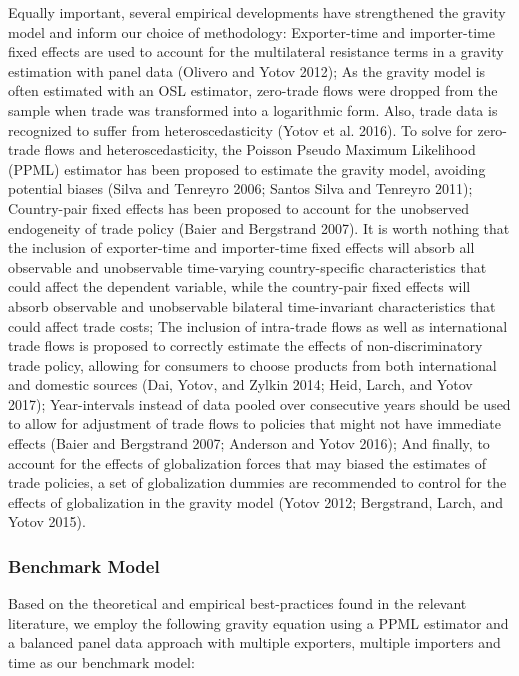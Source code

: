 \documentclass[12pt]{article}%
\begin{document}
Equally important, several empirical developments have strengthened the
gravity model and inform our choice of methodology: Exporter-time and
importer-time fixed effects are used to account for the multilateral
resistance terms in a gravity estimation with panel data (Olivero and
Yotov 2012); As the gravity model is often estimated with an OSL
estimator, zero-trade flows were dropped from the sample when trade was
transformed into a logarithmic form. Also, trade data is recognized to
suffer from heteroscedasticity (Yotov et al. 2016). To solve for
zero-trade flows and heteroscedasticity, the Poisson Pseudo Maximum
Likelihood (PPML) estimator has been proposed to estimate the gravity
model, avoiding potential biases (Silva and Tenreyro 2006; Santos Silva
and Tenreyro 2011); Country-pair fixed effects has been proposed to
account for the unobserved endogeneity of trade policy (Baier and
Bergstrand 2007). It is worth nothing that the inclusion of
exporter-time and importer-time fixed effects will absorb all observable
and unobservable time-varying country-specific characteristics that
could affect the dependent variable, while the country-pair fixed
effects will absorb observable and unobservable bilateral time-invariant
characteristics that could affect trade costs; The inclusion of
intra-trade flows as well as international trade flows is proposed to
correctly estimate the effects of non-discriminatory trade policy,
allowing for consumers to choose products from both international and
domestic sources (Dai, Yotov, and Zylkin 2014; Heid, Larch, and Yotov
2017); Year-intervals instead of data pooled over consecutive years
should be used to allow for adjustment of trade flows to policies that
might not have immediate effects (Baier and Bergstrand 2007; Anderson
and Yotov 2016); And finally, to account for the effects of
globalization forces that may biased the estimates of trade policies, a
set of globalization dummies are recommended to control for the effects
of globalization in the gravity model (Yotov 2012; Bergstrand, Larch,
and Yotov 2015).
%
\subsubsection{Benchmark Model}%
\label{ssubsec:BenchmarkModel}%

%
Based on the theoretical and empirical best-practices found in the
relevant literature, we employ the following gravity equation using a
PPML estimator and a balanced panel data approach with multiple
exporters, multiple importers and time as our benchmark model:
\end{document}
